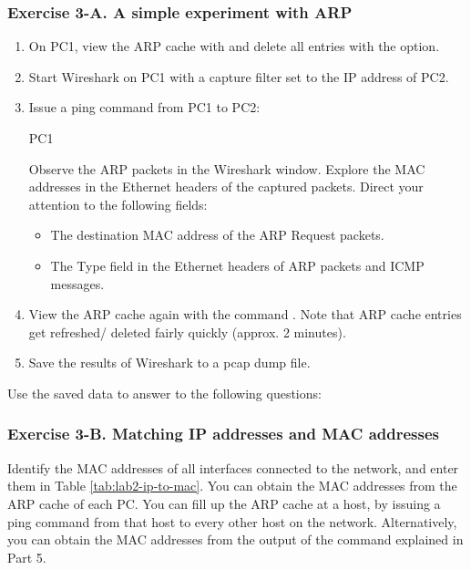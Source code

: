 \subsubsection*{Exercise 3-A. A simple experiment with ARP}
\begin{enumerate}
	\item On PC1, view the ARP cache with  and delete all entries with the   option.
	\item Start Wireshark on PC1 with a capture filter set to the IP address of PC2.
	\item Issue a ping command from PC1 to PC2:
		\begin{cmdblock}
	PC1%
		\end{cmdblock}
	Observe the ARP packets in the Wireshark window. Explore the MAC addresses in the Ethernet headers of the captured packets. Direct your attention to the following fields:
		\begin{itemize}
			\item The destination MAC address of the ARP Request packets.
			\item The Type field in the Ethernet headers of ARP packets and ICMP messages.
		\end{itemize}
	\item View the ARP cache again with the command . Note that ARP cache entries get refreshed/ deleted fairly quickly (approx. 2 minutes).
	\item Save the results of Wireshark to a pcap dump file.
\end{enumerate}

Use the saved data to answer to the following questions:

\begin{questions}
\end{questions}
	
\subsubsection*{Exercise 3-B. Matching IP addresses and MAC addresses}
Identify the MAC addresses of all interfaces connected to the network, and enter them in Table \ref{tab:lab2-ip-to-mac}. You can obtain the MAC addresses from the ARP cache of each PC. You can fill up the ARP cache at a host, by issuing a ping command from that host to every other host on the network. Alternatively, you can obtain the MAC addresses from the output of the  command explained in Part 5.

